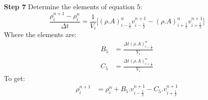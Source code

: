\documentclass[11pt,letterpaper,titlepage]{article}
\newcommand{\half}{\frac{1}{2}}
\begin{document}
\vspace{1.0cm}\noindent
\textbf{Step 7}\newline
Determine the elements of equation 5:
\begin{equation*}
\frac{\rho_i^{n+1} - \rho_i^{n}}{\Delta t} = \frac{1}{V_i}\biggr[ (\rho.A)_{i-\half}^{n}v_{i-\half}^{n+1}-(\rho.A)_{i+\half}^{n} v_{i+\half}^{n+1} \biggr]
\end{equation*}
\newline
Where the elements are:
\begin{equation*}
\begin{aligned}
B_5&=\frac{\Delta t (\rho.A)_{i-\half}^{n}}{V_i}\\
C_5&=\frac{\Delta t (\rho.A)_{i+\half}^{n}}{V_i}
\end{aligned}
\end{equation*}
\newline
To get:
\begin{equation}
\begin{aligned}
\rho_i^{n+1}&=\rho_i^{n}+B_5.v_{i-\half}^{n+1} - C_5.v_{i+\half}^{n+1}\\
\end{aligned}
\end{equation}
\end{document}
